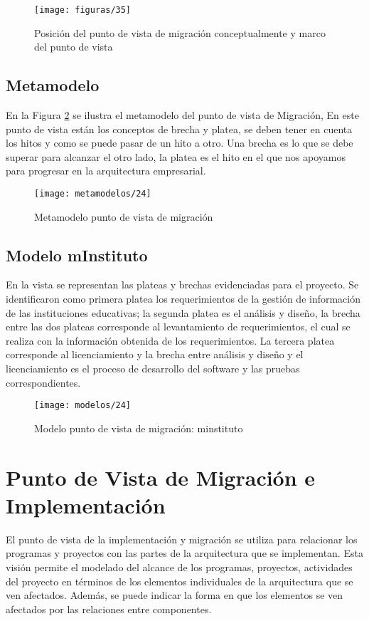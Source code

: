   \begin{figure}[H]
	\centering
	\texttt{[image: figuras/35]}
	\captionsetup{width=.95\textwidth}
	\caption{Posición del punto de vista de migración conceptualmente y marco del punto de vista \cite{ref9}}
	\label{figura36}
  \end{figure}

  \subsection{Metamodelo}
  En la Figura \ref{metamodelo24} se ilustra el metamodelo del punto de vista de Migración, En este punto de vista están los conceptos de brecha y platea, se deben tener en cuenta los hitos y como se puede pasar de un hito a otro. Una brecha es lo que se debe superar para alcanzar el otro lado, la platea es el hito en el que nos apoyamos para progresar en la arquitectura empresarial. \cite{ref9}

  \begin{figure}[H]
	\centering
	\texttt{[image: metamodelos/24]}
	\captionsetup{width=.95\textwidth}
	\caption{Metamodelo punto de vista de migración \cite{ref9}}
	\label{metamodelo24}
  \end{figure}

  \subsection{Modelo mInstituto}
  En la vista se representan las plateas y brechas evidenciadas para el proyecto.  Se identificaron como primera platea los requerimientos de la gestión de información de las instituciones educativas; la segunda platea es el análisis y diseño, la brecha entre las dos plateas corresponde al levantamiento de requerimientos, el cual se realiza con la información obtenida de los requerimientos.  La tercera platea corresponde al licenciamiento y la brecha entre análisis y diseño y el licenciamiento es el proceso de desarrollo del software y las pruebas correspondientes. 
  
  \begin{figure}[H]
	\centering
	\texttt{[image: modelos/24]}
	\captionsetup{width=.95\textwidth}
	\caption{Modelo punto de vista de migración: minstituto}
	\label{modelo24}
  \end{figure}
  
\section{Punto de Vista de Migración e Implementación}
El punto de vista de la implementación y migración se utiliza para relacionar los programas y proyectos con las partes de la arquitectura que se implementan. Esta visión permite el modelado del alcance de los programas, proyectos, actividades del proyecto en términos de los elementos individuales de la arquitectura que se ven afectados. Además, se puede indicar la forma en que los elementos se ven afectados por las relaciones entre componentes. \cite{ref9}

